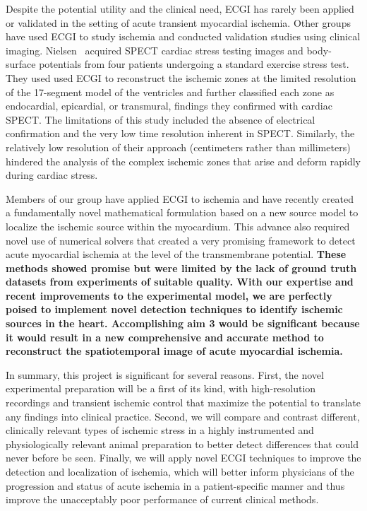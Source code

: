 Despite the potential utility and the clinical need, ECGI has rarely
been applied or validated in the setting of acute transient myocardial
ischemia.  Other groups have used ECGI to study ischemia and conducted
validation studies using clinical imaging. Nielsen \etal~acquired SPECT
cardiac stress testing images and body-surface potentials from four
patients undergoing a standard exercise stress test.\cite{BMB:Nie2013} They
used used ECGI to reconstruct the ischemic zones at the limited resolution
of the 17-segment model of the ventricles and further classified each zone
as endocardial, epicardial, or transmural, findings they confirmed with
cardiac SPECT. The limitations of this study included the absence of
electrical confirmation and the very low time resolution inherent in SPECT.
Similarly, the relatively low resolution of their approach (centimeters
rather than millimeters) hindered the analysis of the complex ischemic
zones that arise and deform rapidly during cardiac stress.

Members of our group have applied ECGI to ischemia \cite{RSM:Mac95} and
have recently created a fundamentally novel mathematical
formulation based on a new source model to localize the ischemic source
within the myo\-card\-ium.\cite{RSM:Wan2013,RSM:Wan2011a} This advance also
required novel use of numerical solvers that created a very promising
framework to detect acute myocardial ischemia at the level of the
transmembrane potential. \textbf{These methods showed promise but were
  limited by the lack of ground truth datasets from experiments of suitable
  quality. With our expertise and recent improvements to the experimental
  model, we are perfectly poised to implement novel detection techniques to
  identify ischemic sources in the heart. Accomplishing aim 3 would be
  significant because it would result in a new comprehensive and accurate
  method to reconstruct the spatiotemporal image of acute myocardial
  ischemia.}

In summary, this project is significant for several reasons. First, the
novel experimental preparation will be a first of its kind, with high-resolution recordings and transient ischemic control that maximize the
potential to translate any findings into clinical practice. Second, we
will compare and contrast different, clinically relevant types of ischemic
stress in a highly instrumented and physiologically relevant animal
preparation to better detect differences that could never before be
seen. Finally, we will apply novel ECGI techniques to improve the detection
and localization of ischemia, which will better inform physicians of the
progression and status of acute ischemia in a patient-specific manner and
thus improve the unacceptably poor performance of current clinical methods.


